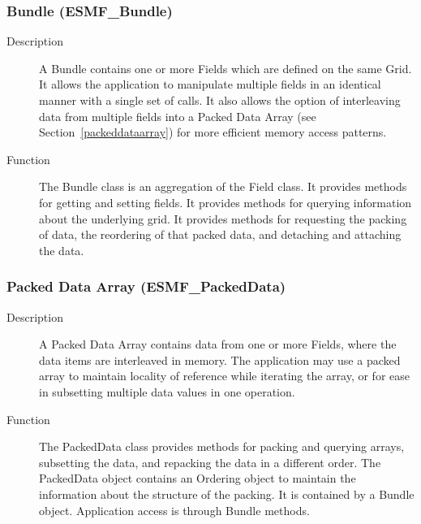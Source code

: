\subsubsection{Bundle (ESMF\_Bundle)}
\label{sec:bundle} 
\begin{description}
\item [Description] A Bundle contains one or more Fields which are defined on the
same Grid.  It allows the application to manipulate multiple fields in an identical
manner with a single set of calls.  It also allows the option of interleaving data
from multiple fields into a Packed Data Array (see Section~\ref{packeddataarray}) for
more efficient memory access patterns.
\item [Function] The Bundle class is an aggregation of the Field class.  It provides methods 
for getting and setting fields.  It provides methods for querying information about the
underlying grid.  It provides methods for requesting the packing of data, the
reordering of that packed data, and detaching and attaching the data.
\end{description}

\subsubsection{Packed Data Array (ESMF\_PackedData)}
\label{sec:packeddataarray} 
\begin{description}
\item [Description] A Packed Data Array contains data from one or more Fields, where the
data items are interleaved in memory. The application may use a packed array to maintain
locality of reference while iterating the array, or for ease in subsetting multiple
data values in one operation.
\item [Function] The PackedData class provides methods for packing and querying arrays,
subsetting the data, and repacking the data in a different order.  The PackedData object
contains an Ordering object to maintain the information about the structure of the packing.
It is contained by a Bundle object.  Application access is through Bundle methods.
\end{description}

